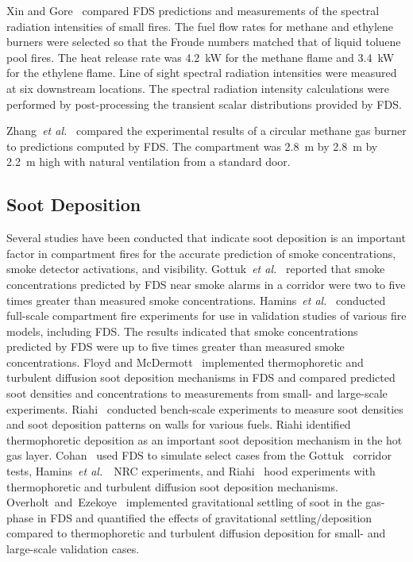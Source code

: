 Xin  and Gore~\cite{Xin:JSS2003}  compared  FDS predictions  and measurements of the spectral radiation intensities of small fires. The fuel flow rates for methane and ethylene burners were selected so that the Froude numbers matched that of liquid toluene pool fires. The heat release rate was 4.2~kW for the methane flame and 3.4~kW for the ethylene flame. Line of sight spectral radiation intensities were measured at six downstream locations.  The spectral radiation intensity calculations were performed by post-processing the transient scalar distributions provided by FDS.

Zhang~{\em et al.}~\cite{Zhang:1} compared the experimental results of a circular methane gas burner to predictions computed by FDS. The compartment was 2.8~m by 2.8~m by 2.2~m high with natural ventilation from a standard door.




\subsection{Soot Deposition}

Several studies have been conducted that indicate soot deposition is an important factor in compartment fires
for the accurate prediction of smoke concentrations, smoke detector activations, and visibility.
Gottuk~{\em et al.}~\cite{Gottuk:IAFSS2008} reported that smoke concentrations predicted by FDS near smoke alarms in a
corridor were two to five times greater than measured smoke concentrations. Hamins~{\em et al.}~\cite{Hamins:SP1013-1}
conducted full-scale compartment fire experiments for use in validation studies of various fire models, including FDS.
The results indicated that smoke concentrations predicted by FDS were up to five times greater than measured
smoke concentrations. Floyd and McDermott~\cite{Floyd:Interflam2010} implemented thermophoretic and turbulent diffusion soot
deposition mechanisms in FDS and compared predicted soot densities and concentrations to measurements from small- and large-scale
experiments. Riahi~\cite{Riahi:2011} conducted bench-scale experiments to measure soot densities and soot
deposition patterns on walls for various fuels. Riahi identified thermophoretic deposition as an important soot deposition
mechanism in the hot gas layer. Cohan~\cite{Cohan:Masters} used FDS to simulate select cases from the
Gottuk~\cite{Gottuk:IAFSS2008} corridor tests, Hamins~{\em et al.}~\cite{Hamins:SP1013-1}~NRC experiments, and
Riahi~\cite{Riahi:2011} hood experiments with thermophoretic and turbulent diffusion soot deposition mechanisms.
Overholt~and~Ezekoye~\cite{Overholt:1} implemented gravitational settling of soot in the gas-phase in FDS and quantified
the effects of gravitational settling/deposition compared to thermophoretic and turbulent diffusion deposition for small- and
large-scale validation cases.




